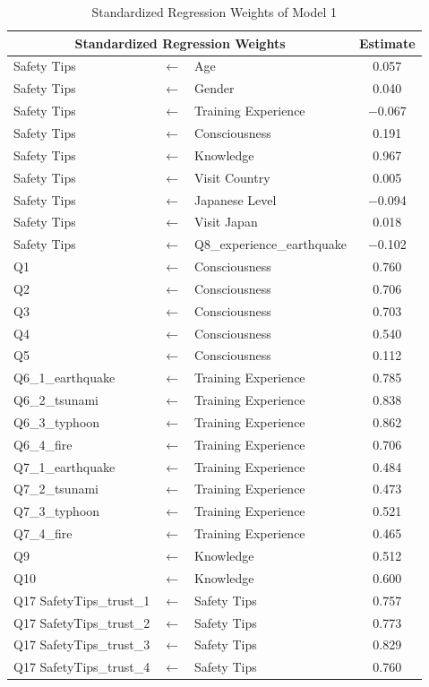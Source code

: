 \begin{table}[h]
  \caption{Standardized Regression Weights of Model 1 }
  \label{table10}
  \centering
  \begin{tabular}{|l|c|l|c|}
 \hline
 \multicolumn{3}{|c|}{Standardized Regression Weights} & Estimate \\
 \hline
  Safety Tips & $\longleftarrow$ & Age & 0.057 \\ 
  Safety Tips & $\longleftarrow$ & Gender &0.040 \\
  Safety Tips & $\longleftarrow$ & Training Experience & $-$0.067 \\
  Safety Tips & $\longleftarrow$ & Consciousness & 0.191 \\
  Safety Tips & $\longleftarrow$ & Knowledge & 0.967 \\
  Safety Tips & $\longleftarrow$ & Visit Country & 0.005 \\
  Safety Tips & $\longleftarrow$ & Japanese Level & $-$0.094 \\
  Safety Tips & $\longleftarrow$ & Visit Japan & 0.018 \\
  Safety Tips & $\longleftarrow$ & Q8\_experience\_earthquake & $-$0.102 \\
  Q1              & $\longleftarrow$ & Consciousness & 0.760\\
  Q2              & $\longleftarrow$ & Consciousness & 0.706 \\
  Q3              & $\longleftarrow$ & Consciousness & 0.703\\
  Q4              & $\longleftarrow$ & Consciousness & 0.540 \\
  Q5              & $\longleftarrow$ & Consciousness & 0.112 \\
  Q6\_1\_earthquake & $\longleftarrow$ & Training Experience & 0.785 \\
  Q6\_2\_tsunami & $\longleftarrow$ & Training Experience & 0.838 \\
  Q6\_3\_typhoon & $\longleftarrow$ & Training Experience & 0.862 \\
  Q6\_4\_fire & $\longleftarrow$ & Training Experience & 0.706 \\
  Q7\_1\_earthquake & $\longleftarrow$ & Training Experience & 0.484 \\
  Q7\_2\_tsunami & $\longleftarrow$ & Training Experience & 0.473 \\
  Q7\_3\_typhoon & $\longleftarrow$ & Training Experience & 0.521 \\
  Q7\_4\_fire & $\longleftarrow$ & Training Experience & 0.465\\
  Q9             & $\longleftarrow$ & Knowledge & 0.512\\
  Q10           & $\longleftarrow$ & Knowledge & 0.600 \\
  Q17 SafetyTips\_trust\_1 & $\longleftarrow$ & Safety Tips & 0.757 \\
  Q17 SafetyTips\_trust\_2 & $\longleftarrow$ & Safety Tips & 0.773 \\
  Q17 SafetyTips\_trust\_3 & $\longleftarrow$ & Safety Tips & 0.829 \\
  Q17 SafetyTips\_trust\_4 & $\longleftarrow$ & Safety Tips & 0.760 \\
 \hline
  \end{tabular}
\end{table}

